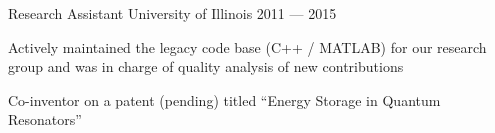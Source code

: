 \begin{cventries}
  \cventry%
  {Research Assistant} %
  {University of Illinois}
  {\color{awesome}{Center for Complex Systems Research}} %
  {2011 --- 2015}
  {
  \begin{cvitems}%
    \item{Actively maintained the legacy code base (C++ / MATLAB) for our
      research group and was in charge of quality analysis of new
      contributions}
      \begin{cvsubitems}
      \item{Co-inventor on a patent (pending) titled ``Energy Storage in Quantum Resonators''}
      \end{cvsubitems}
  \end{cvitems}%
  }

\end{cventries}
